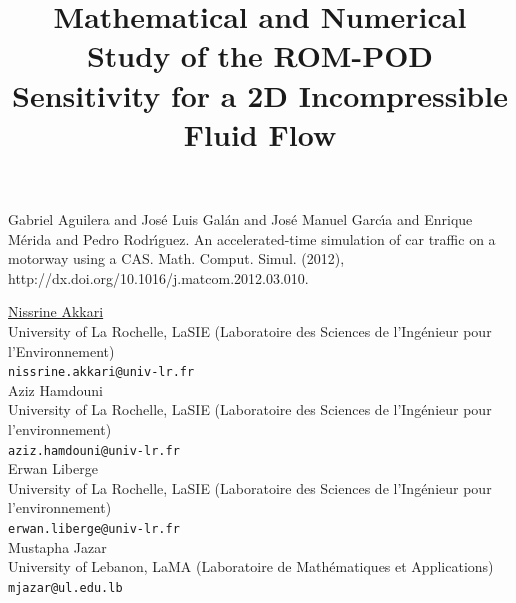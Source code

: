 \documentclass[article, A4, 11pt]{llncs}%
\begin{document}

\begin{thebibliography}{10}
{\sc Gabriel Aguilera and Jos\'e Luis Gal\'an and Jos\'e Manuel Garc\'{\i}a and Enrique M\'erida and Pedro Rodr\'{\i}guez}. {An accelerated-time simulation of car traffic on a motorway using a CAS}. Math. Comput. Simul. (2012), http://dx.doi.org/10.1016/j.matcom.2012.03.010.
\end{thebibliography} %

\title{Mathematical and Numerical Study of the ROM-POD Sensitivity for a 2D Incompressible Fluid Flow}
 \author{} \institute{}
\maketitle
\begin{center}
{\large \underline{Nissrine Akkari}}\\
University of La Rochelle, LaSIE (Laboratoire des Sciences de l'Ingénieur pour l'Environnement)\\
{\tt nissrine.akkari@univ-lr.fr}
\\ \vspace{4mm}
{\large Aziz Hamdouni}\\
University of La Rochelle, LaSIE (Laboratoire des Sciences de l'Ingénieur pour l'environnement)\\
{\tt aziz.hamdouni@univ-lr.fr}
\\ \vspace{4mm}
{\large Erwan Liberge}\\
University of La Rochelle, LaSIE (Laboratoire des Sciences de l'Ingénieur pour l'environnement)\\
{\tt erwan.liberge@univ-lr.fr}
\\ \vspace{4mm}
{\large Mustapha Jazar}\\
University of Lebanon, LaMA (Laboratoire de Mathématiques et Applications)\\
{\tt mjazar@ul.edu.lb}
\end{center}
\end{document}
